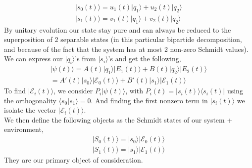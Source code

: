 \documentclass{article}
\begin{document}
\begin{align*}
    |s_0(t)\rangle = u_1(t)|q_1\rangle + u_2(t)|q_2\rangle\\
    |s_1(t)\rangle = v_1(t)|q_1\rangle + v_2(t)|q_2\rangle
\end{align*}
By unitary evolution our state stay pure and can always be reduced to the superposition of 2 separable states (in this particular bipartide decomposition, and because of the fact that the system has at most 2 non-zero Schmidt values). We can express our $|q_i\rangle$'s from $|s_i\rangle$'s and get the following, 
\begin{align*}
    |\psi(t)\rangle = A(t)|q_1\rangle|E_1(t)\rangle+B(t)|q_2\rangle|E_2(t)\rangle \\
    =A'(t)|s_0\rangle|\mathcal{E}_0(t)\rangle+B'(t)|s_1\rangle|\mathcal{E}_1(t)\rangle
\end{align*}
To find $|\mathcal{E}_i(t)\rangle$, we consider $P_i|\psi(t)\rangle$, with $P_i(t)=|s_i(t)\rangle\langle s_i(t)|$ using the orthogonality $\langle s_0|s_1 \rangle=0$. And finding the first nonzero term in $|s_i(t)\rangle$ we isolate the vector $|\mathcal{E}_i(t)\rangle$. \\
We then define the following objects as the Schmidt states of our system + environment,
\begin{align*}
    |S_0(t)\rangle = |s_0\rangle|\mathcal{E}_0(t)\rangle
    \\
    |S_1(t)\rangle = |s_1\rangle|\mathcal{E}_1(t)\rangle
\end{align*}
They are our primary object of consideration.
\end{document}
